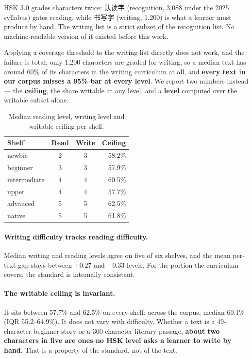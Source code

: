 \documentclass[11pt]{article}
\begin{document}
HSK 3.0 grades characters twice: 认读字 (recognition, 3,088 under the 2025
syllabus) gates reading, while 书写字 (writing, 1,200) is what a learner must
produce by hand. The writing list is a strict subset of the recognition list.
No machine-readable version of it existed before this work.

Applying a coverage threshold to the writing list directly does not work, and
the failure is total: only 1,200 characters are graded for writing, so a median
text has around 60\% of its characters in the writing curriculum at all, and
\textbf{every text in our corpus misses a 95\% bar at every level}. We report
two numbers instead --- the \textbf{ceiling}, the share writable at any level,
and a \textbf{level} computed over the writable subset alone.

\begin{table}[t]
\centering\small
\begin{tabular}{@{}lccr@{}}
\toprule
\textbf{Shelf} & \textbf{Read} & \textbf{Write} & \textbf{Ceiling} \\
\midrule
newbie       & 2 & 3 & 58.2\% \\
beginner     & 3 & 3 & 57.9\% \\
intermediate & 4 & 4 & 60.5\% \\
upper        & 4 & 4 & 57.7\% \\
advanced     & 5 & 5 & 62.5\% \\
native       & 5 & 5 & 61.8\% \\
\bottomrule
\end{tabular}
\caption{Median reading level, writing level and writable ceiling per shelf.}
\label{tab:writing}
\end{table}

\paragraph{Writing difficulty tracks reading difficulty.} Median writing and
reading levels agree on five of six shelves, and the mean per-text gap stays
between $+0.27$ and $-0.33$ levels. For the portion the curriculum covers, the
standard is internally consistent.

\paragraph{The writable ceiling is invariant.} It sits between 57.7\% and
62.5\% on every shelf; across the corpus, median 60.1\% (IQR 55.2--64.9\%). It
does not vary with difficulty. Whether a text is a 49-character beginner story
or a 300-character literary passage, \textbf{about two characters in five are
ones no HSK level asks a learner to write by hand}. That is a property of the
standard, not of the text.
\end{document}
